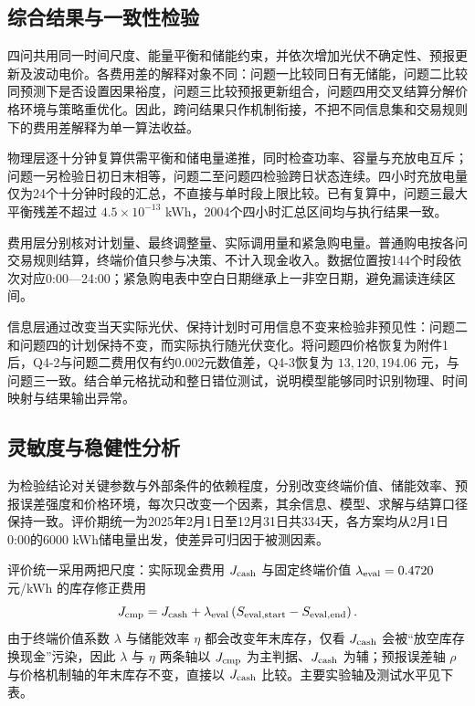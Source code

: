 \documentclass[withoutpreface,bwprint]{cumcmthesis}
\begin{document}
\subsection{综合结果与一致性检验}

四问共用同一时间尺度、能量平衡和储能约束，并依次增加光伏不确定性、预报更新及波动电价。各费用差的解释对象不同：问题一比较同日有无储能，问题二比较同预测下是否设置因果裕度，问题三比较预报更新组合，问题四用交叉结算分解价格环境与策略重优化。因此，跨问结果只作机制衔接，不把不同信息集和交易规则下的费用差解释为单一算法收益。

物理层逐十分钟复算供需平衡和储电量递推，同时检查功率、容量与充放电互斥；问题一另检验日初日末相等，问题二至问题四检验跨日状态连续。四小时充放电量仅为24个十分钟时段的汇总，不直接与单时段上限比较。已有复算中，问题三最大平衡残差不超过 \(4.5\times10^{-13}\) kWh，2004个四小时汇总区间均与执行结果一致。

费用层分别核对计划量、最终调整量、实际调用量和紧急购电量。普通购电按各问交易规则结算，终端价值只参与决策、不计入现金收入。数据位置按144个时段依次对应0:00---24:00；紧急购电表中空白日期继承上一非空日期，避免漏读连续区间。

信息层通过改变当天实际光伏、保持计划时可用信息不变来检验非预见性：问题二和问题四的计划保持不变，而实际执行随光伏变化。将问题四价格恢复为附件1后，Q4-2与问题二费用仅有约0.002元数值差，Q4-3恢复为 \(13{,}120{,}194.06\) 元，与问题三一致。结合单元格扰动和整日错位测试，说明模型能够同时识别物理、时间映射与结果输出异常。
\subsection{灵敏度与稳健性分析}\label{sec:sensitivity}

为检验结论对关键参数与外部条件的依赖程度，分别改变终端价值、储能效率、预报误差强度和价格环境，每次只改变一个因素，其余信息、模型、求解与结算口径保持一致。评价期统一为2025年2月1日至12月31日共334天，各方案均从2月1日0:00的6000 kWh储电量出发，使差异可归因于被测因素。

评价统一采用两把尺度：实际现金费用 \(J_{\rm cash}\) 与固定终端价值 \(\lambda_{\rm eval}=0.4720\) 元/kWh 的库存修正费用
\begin{equation}
J_{\rm cmp}=J_{\rm cash}+\lambda_{\rm eval}\left(S_{\rm eval,start}-S_{\rm eval,end}\right).
\end{equation}
由于终端价值系数 \(\lambda\) 与储能效率 \(\eta\) 都会改变年末库存，仅看 \(J_{\rm cash}\) 会被``放空库存换现金''污染，因此 \(\lambda\) 与 \(\eta\) 两条轴以 \(J_{\rm cmp}\) 为主判据、\(J_{\rm cash}\) 为辅；预报误差轴 \(\rho\) 与价格机制轴的年末库存不变，直接以 \(J_{\rm cash}\) 比较。主要实验轴及测试水平见下表。
\end{document}
